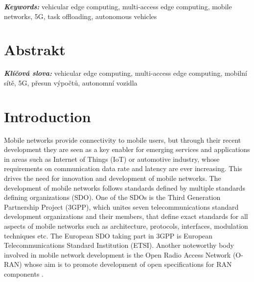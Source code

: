 \documentclass[12pt,a4paper,twoside]{report}
\providecommand{\keywords}[1]{\vspace{4pt}\textbf{\textit{Keywords: }} #1}
\providecommand{\keywordscz}[1]{\vspace{4pt}\textbf{\textit{Klíčová slova: }} #1}
\begin{document}
\keywords{vehicular edge computing, multi-access edge computing, mobile networks, 5G, task offloading, autonomous vehicles}
%
%
\newpage

\chapter*{Abstrakt}
\keywordscz{vehicular edge computing, multi-access edge computing, mobilní sítě, 5G, přesun výpočtů, autonomn\'i vozidla}
%
%
\newpage

\tableofcontents			

\glsaddallunused
\printglossary[type=\acronymtype,title={List of Abbreviations}]	%



\newpage

\setcounter{page}{1}

\chapter{Introduction}
Mobile networks provide connectivity to mobile users, but through their recent development they are seen as a key enabler for emerging services and applications in areas such as Internet of Things (IoT) or automotive industry, whose requirements on communication data rate and latency are ever increasing. This drives the need for innovation and development of mobile networks. The development of mobile networks follows standards defined by multiple standards defining organizations (SDO). One of the SDOs is the Third Generation Partnership Project (3GPP), which unites seven telecommunications standard development organizations and their members, that define exact standards for all aspects of mobile networks such as architecture, protocols, interfaces, modulation techniques etc. The European SDO taking part in 3GPP is European Telecommunications Standard Institution (ETSI). Another noteworthy body involved in mobile network development is the Open Radio Access Network (O-RAN) whose aim is to promote development of open specifications for RAN components \cite{o-ran-web}. 
\end{document}
